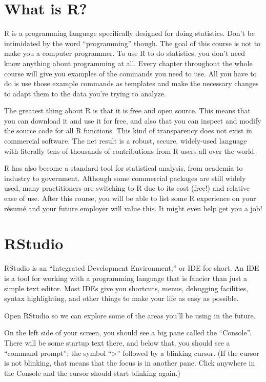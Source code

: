 \documentclass[
]{book}
\begin{document}
\hypertarget{intror-whatisr}{%
\section{What is R?}\label{intror-whatisr}}

R is a programming language specifically designed for doing statistics. Don't be intimidated by the word ``programming'' though. The goal of this course is not to make you a computer programmer. To use R to do statistics, you don't need know anything about programming at all. Every chapter throughout the whole course will give you examples of the commands you need to use. All you have to do is use those example commands as templates and make the necessary changes to adapt them to the data you're trying to analyze.

The greatest thing about R is that it is free and open source. This means that you can download it and use it for free, and also that you can inspect and modify the source code for all R functions. This kind of transparency does not exist in commercial software. The net result is a robust, secure, widely-used language with literally tens of thousands of contributions from R users all over the world.

R has also become a standard tool for statistical analysis, from academia to industry to government. Although some commercial packages are still widely used, many practitioners are switching to R due to its cost (free!) and relative ease of use. After this course, you will be able to list some R experience on your résumé and your future employer will value this. It might even help get you a job!

\hypertarget{intror-rstudio}{%
\section{RStudio}\label{intror-rstudio}}

RStudio is an ``Integrated Development Environment,'' or IDE for short. An IDE is a tool for working with a programming language that is fancier than just a simple text editor. Most IDEs give you shortcuts, menus, debugging facilities, syntax highlighting, and other things to make your life as easy as possible.

Open RStudio so we can explore some of the areas you'll be using in the future.

On the left side of your screen, you should see a big pane called the ``Console''. There will be some startup text there, and below that, you should see a ``command prompt'': the symbol ``\textgreater{}'' followed by a blinking cursor. (If the cursor is not blinking, that means that the focus is in another pane. Click anywhere in the Console and the cursor should start blinking again.)
\end{document}
